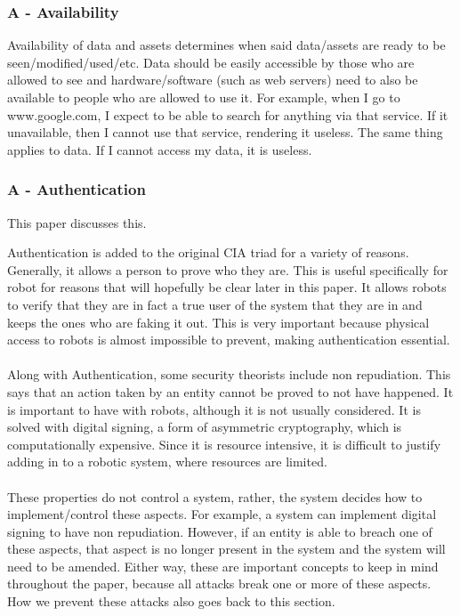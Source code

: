 \subsubsection{A - Availability}

Availability of data and assets determines when said data/assets are ready to be seen/modified/used/etc. Data should be easily accessible by those who are allowed to see and hardware/software (such as web servers) need to also be available to people who are allowed to use it. For example, when I go to www.google.com, I expect to be able to search for anything via that service. If it unavailable, then I cannot use that service, rendering it useless. The same thing applies to data. If I cannot access my data, it is useless.



\subsubsection{A - Authentication}

This \cite{article:Martin} paper discusses this.

Authentication is added to the original CIA triad for a variety of reasons. Generally, it allows a person to prove who they are. This is useful specifically for robot for reasons that will hopefully be clear later in this paper. It allows robots to verify that they are in fact a true user of the system that they are in and keeps the ones who are faking it out. This is very important because physical access to robots is almost impossible to prevent, making authentication essential.
\\\\
Along with Authentication, some security theorists include non repudiation. This says that an action taken by an entity cannot be proved to not have happened. It is important to have with robots, although it is not usually considered. It is solved with digital signing, a form of asymmetric cryptography, which is computationally expensive. Since it is resource intensive, it is difficult to justify adding in to a robotic system, where resources are limited.
\\\\
These properties do not control a system, rather, the system decides how to implement/control these aspects. For example, a system can implement digital signing to have non repudiation. However, if an entity is able to breach one of these aspects, that aspect is no longer present in the system and the system will need to be amended. Either way, these are important concepts to keep in mind throughout the paper, because all attacks break one or more of these aspects. How we prevent these attacks also goes back to this section.

